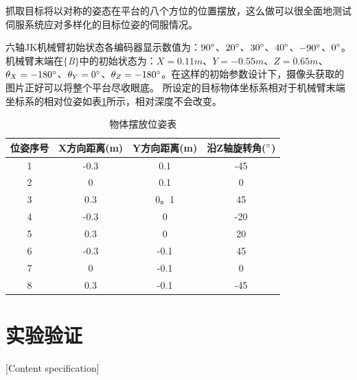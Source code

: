 \documentclass[fontset=fandol,type=bachelor,campus=harbin,bsmainpagenumberline=true]{hithesisbook}
\begin{document}
抓取目标将以对称的姿态在平台的八个方位的位置摆放，这么做可以很全面地测试伺服系统应对多样化的目标位姿的伺服情况。


六轴JK机械臂初始状态各编码器显示数值为：$90\degree$、$20\degree$、$30\degree$、$40\degree$、$-90\degree$、$0\degree$。机械臂末端在$\lbrace$\textit{B}$\rbrace$中的初始状态为：$X=0.11m$、$Y=-0.55m$、$Z=0.65m$、$\theta_X=-180\degree$、$\theta_Y=0\degree$、$\theta_Z=-180\degree$。在这样的初始参数设计下，摄像头获取的图片正好可以将整个平台尽收眼底。
所设定的目标物体坐标系相对于机械臂末端坐标系的相对位姿如表\ref{物体摆放位姿表}所示，相对深度不会改变。
\begin{table}[htbp]
\caption{物体摆放位姿表}
\label{物体摆放位姿表}
\vspace{0.5em}\centering\wuhao
\begin{tabular}{cccc}
\toprule[2pt]
位姿序号 & X方向距离(m) & Y方向距离(m) & 沿Z轴旋转角($\degree$)\\
\midrule[1pt]
 1 & -0.3 & 0.1 & -45\\
 2 & 0 & 0.1 & 0\\
 3 & 0.3 & 0。1 & 45\\
 4 & -0.3 & 0 & -20\\
 5 & 0.3 & 0 & 20\\
 6 & -0.3 & -0.1 & 45\\
 7 & 0 & -0.1 & 0\\
 8 & 0.3 & -0.1 & -45\\

\bottomrule[1.5pt]
\end{tabular}
\end{table}





\section{实验验证}[Content specification]
\end{document}
